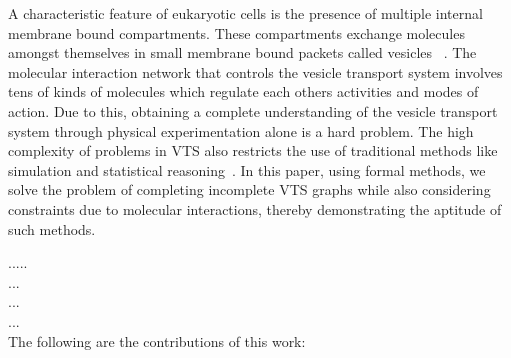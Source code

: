 A characteristic feature of eukaryotic cells is the presence of multiple internal membrane bound compartments. These compartments exchange molecules amongst themselves in small membrane bound packets called vesicles ~\cite{alberts2002molecular}.  The molecular interaction network that controls the vesicle transport system involves tens of kinds of molecules which regulate each others activities and modes of action. Due to this, obtaining a complete understanding of the vesicle transport system through physical experimentation alone is a hard problem.
%
The high complexity of problems in VTS also restricts the use of traditional methods like simulation and statistical reasoning~\cite{mani2016wine, mani2016stacking}. 
In this paper, using formal methods, we solve the problem of completing incomplete VTS graphs while also considering constraints due to molecular interactions, thereby demonstrating the aptitude of such methods.


 ..... \\ ... \\

 ... \\ ... \\


The following are the contributions of this work:


~        
